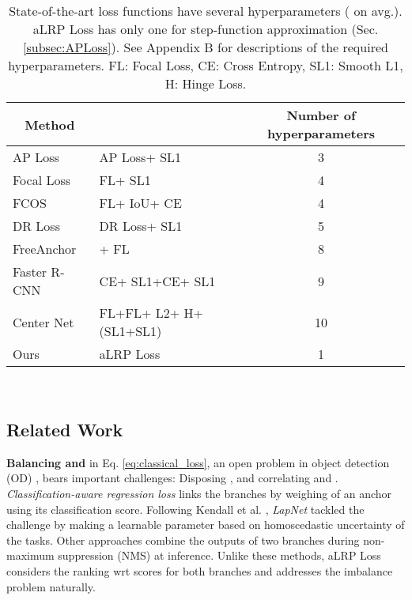 \documentclass{article}
\newcommand{\cellcenter}[1]{\multicolumn{1}{|c|}{#1}}
\begin{document}
\begin{table}[t]
\centering
    \caption{State-of-the-art loss functions have several hyperparameters ( on avg.). aLRP Loss has only one for step-function approximation (Sec. \ref{subsec:APLoss}). See Appendix B for descriptions of the required hyperparameters. FL: Focal Loss, CE: Cross Entropy, SL1: Smooth L1, H: Hinge Loss. }
    \label{tab:Hyperparameters}
    \begin{tabular}{|l|l|c|}\hline
         \cellcenter{Method}& \cellcenter{} & Number of hyperparameters \\ \hline \hline
        AP Loss \cite{APLoss}&AP Loss+ SL1&3 \\ \hline
        Focal Loss \cite{FocalLoss}&FL+  SL1&4\\ \hline
        FCOS \cite{FCOS}&FL+ IoU+ CE&4\\  \hline
        DR Loss \cite{DRLoss}&DR Loss+ SL1&5\\ \hline
        FreeAnchor \cite{FreeAnchor}& + FL&8\\\hline
        Faster R-CNN \cite{FasterRCNN}&CE+ SL1+CE+ SL1&9\\ \hline
        Center Net \cite{CenterNet}&FL+FL+ L2+ H+ (SL1+SL1)&10\\ \hline \hline
        Ours&aLRP Loss&1 \\ \hline
    \end{tabular}\\
\end{table}



%
 \subsection{Related Work}
\label{sec:RelatedWork}
\textbf{Balancing  and } in Eq. \eqref{eq:classical_loss}, an open problem in object detection (OD) \cite{Review}, bears important challenges: Disposing , and correlating  and . \textit{Classification-aware regression loss} \cite{PrimeSample} links the branches by weighing  of an anchor using its classification score. Following Kendall et al. \cite{WrLearningviaUncertainty}, \textit{LapNet} \cite{LapNet} tackled the challenge by making  a learnable parameter based on homoscedastic uncertainty of the tasks. Other approaches \cite{IoUNet,BoundedIoU} combine the outputs of two branches during non-maximum suppression (NMS) at inference. Unlike these methods, aLRP Loss considers the ranking wrt scores for both branches and  addresses the imbalance problem naturally.
\end{document}

